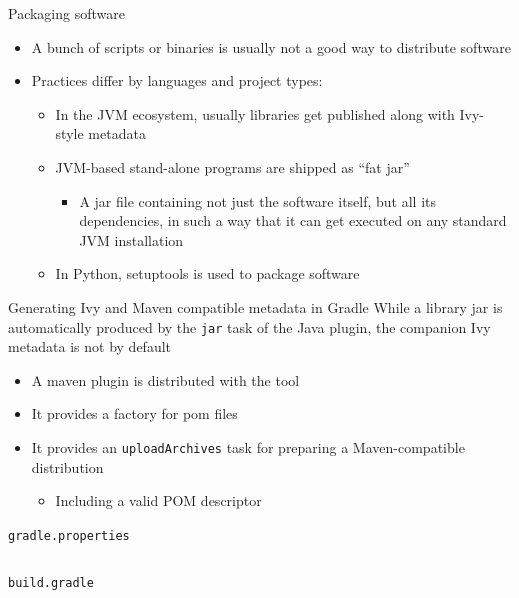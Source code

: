 \documentclass[presentation]{beamer}
\newcommand{\codefile}[4]{
	\begin{block}{\texttt{#2}}
		\inputminted[fontsize=#3,linenos=true,breaklines=true]{#4}{"workspace/#1/#2"}
	\end{block}
}
\newcommand{\groovy}[3]{\codefile{#1}{#2}{#3}{groovy}}
\newcommand{\tinier}{\fontsize{4pt}{5pt}\selectfont}
\begin{document}
\begin{frame}[fragile]{Packaging software}
    \begin{itemize}
        \item A bunch of scripts or binaries is usually not a good way to distribute software
        \item Practices differ by languages and project types:
        \begin{itemize}
            \item In the JVM ecosystem, usually libraries get published along with Ivy-style metadata
            \item JVM-based stand-alone programs are shipped as ``fat jar''
            \begin{itemize}
                \item A jar file containing not just the software itself, but all its dependencies, in such a way that it can get executed on any standard JVM installation
            \end{itemize}
            \item In Python, setuptools is used to package software
        \end{itemize}
    \end{itemize}
\end{frame}

\begin{frame}{Generating Ivy and Maven compatible metadata in Gradle}
    While a library jar is automatically produced by the \texttt{jar} task of the Java plugin, the companion Ivy metadata is not by default
    \begin{itemize}
        \item A maven plugin is distributed with the tool
        \item It provides a factory for pom files
        \item It provides an \texttt{uploadArchives} task for preparing a Maven-compatible distribution
        \begin{itemize}
            \item Including a valid POM descriptor
        \end{itemize}
    \end{itemize}
    \groovy{23-POM}{gradle.properties}{\scriptsize}
    \groovy{23-POM}{build.gradle}{\tinier}
\end{frame}
\end{document}

